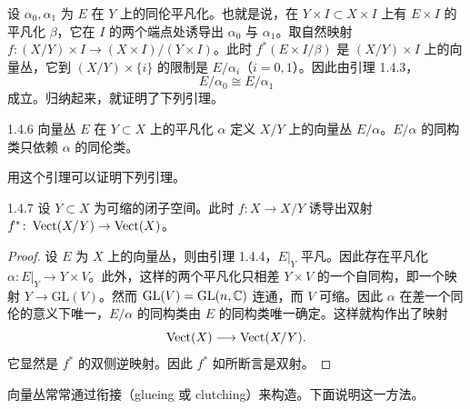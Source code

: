 设 $\alpha_0,\alpha_1$ 为 $E$ 在 $Y$ 上的同伦平凡化。也就是说，在 $Y\times I\subset X\times I$ 上有 $E\times I$ 的平凡化 $\beta$，它在 $I$ 的两个端点处诱导出 $\alpha_0$ 与 $\alpha_1$。取自然映射 $f\colon(X/Y)\times I\to(X\times I)/(Y\times I)$。此时 $f^*(E\times I/\beta)$ 是 $(X/Y)\times I$ 上的向量丛，它到 $(X/Y)\times\{i\}$ 的限制是 $E/\alpha_i$（$i=0,1$）。因此由引理 1.4.3，
\[
E/\alpha_0\cong E/\alpha_1
\]
成立。归纳起来，就证明了下列引理。

\begin{lemma}{1.4.6}
  向量丛 $E$ 在 $Y\subset X$ 上的平凡化 $\alpha$ 定义 $X/Y$ 上的向量丛 $E/\alpha$。$E/\alpha$ 的同构类只依赖 $\alpha$ 的同伦类。
\end{lemma}

用这个引理可以证明下列引理。

\begin{lemma*}{1.4.7}
  设 $Y\subset X$ 为可缩的闭子空间。此时 $f\colon X\to X/Y$ 诱导出双射 $f^*\colon\operatorname{Vect}(X/Y)\to\operatorname{Vect}(X)$。
\end{lemma*}

\begin{proof}
  设 $E$ 为 $X$ 上的向量丛，则由引理 1.4.4，$E|_Y$ 平凡。因此存在平凡化 $\alpha\colon E|_Y\to Y\times V$。此外，这样的两个平凡化只相差 $Y\times V$ 的一个自同构，即一个映射 $Y\to\mathrm{GL}(V)$。然而 $\mathrm{GL}(V)=\mathrm{GL}(n,\mathbb{C})$ 连通，而 $V$ 可缩。因此 $\alpha$ 在差一个同伦的意义下唯一，$E/\alpha$ 的同构类由 $E$ 的同构类唯一确定。这样就构作出了映射
\[
\operatorname{Vect}(X)\longrightarrow\operatorname{Vect}(X/Y).
\]
它显然是 $f^*$ 的双侧逆映射。因此 $f^*$ 如所断言是双射。
\end{proof}


向量丛常常通过衔接（glueing 或 clutching）来构造。下面说明这一方法。

